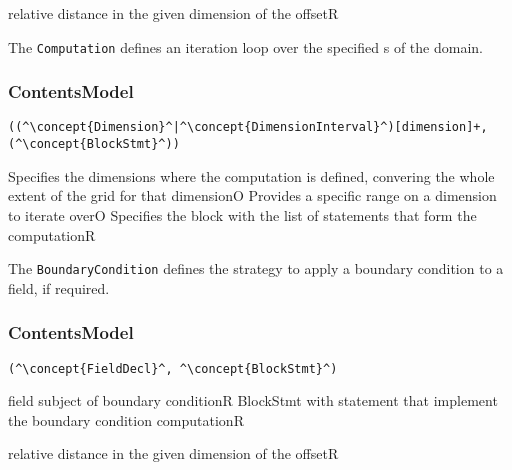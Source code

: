 \begin{HIRAttributes}
	{relative distance in the given dimension of the offset}{R}
\end{HIRAttributes}

The {\tt Computation} defines an iteration loop over the specified s of the domain. 

\subsubsection*{ContentsModel}{}

\begin{lstlisting}[style=default]
((^\concept{Dimension}^|^\concept{DimensionInterval}^)[dimension]+,(^\concept{BlockStmt}^))
\end{lstlisting}

\begin{HIRChildElements}
	{Specifies the dimensions where the computation is defined, 
		convering the whole extent of the grid for that dimension}{O}
	{Provides a specific range on a dimension to iterate over}{O}
	{Specifies the block with the list of statements that form the computation}{R}
\end{HIRChildElements}


The {\tt BoundaryCondition} defines the strategy to apply a boundary condition to a field, if required.

\subsubsection*{ContentsModel}{}

\begin{lstlisting}[style=default]
(^\concept{FieldDecl}^, ^\concept{BlockStmt}^)
\end{lstlisting}

\begin{HIRChildElements}
	{field subject of boundary condition}{R}
	{BlockStmt with statement that implement the boundary condition computation}{R}
		
\end{HIRChildElements}

\begin{HIRAttributes}
	{relative distance in the given dimension of the offset}{R}
\end{HIRAttributes}
